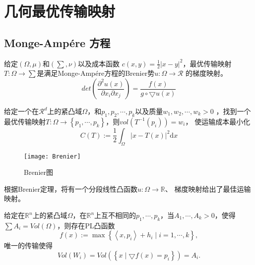 \section{几何最优传输映射}

\subsection{Monge-Amp\'ere 方程}

\begin{problem}[Brenier] \label{pro: Brenier}
    给定$(\Omega, \mu)$和$(\sum, \nu)$以及成本函数 $c(x,y)=\frac{1}{2}\left | x-y \right |^2 $，最优传输映射$T: \Omega \to \sum$是满足Monge-Amp\'ere方程的Brenier势$u:\Omega \to \mathcal{R}$
    的梯度映射。
    \begin{equation}
        \boxed{ det \left ( \frac{\partial ^2 u(x)}{\partial x_i \partial x_j}  \right ) = \frac{f(x)}{g \circ \bigtriangledown u(x)}  }
        \label{equ:Monge-Amp\'ere}
    \end{equation}
\end{problem}

\begin{problem}\label{pro: Semi-discrete OT}
    给定一个在$\mathcal{R}^d$上的紧凸域$\Omega$，和$p_1,p_2,\cdots , p_k$以及质量$w_1,w_2, \cdots , w_k >0$ ，找到一个最优传输映射$T:\Omega \to \left \{ p_1,\cdots ,p_k \right \}$，则$vol(T^{-1}(p_i))=w_i$，
    使运输成本最小化
    \begin{equation}
        C(T):=\frac{1}{2} \int _{\Omega} \left | x-T(x) \right |^2 \mathrm{d}x
        \label{equ:cost} 
    \end{equation}
\end{problem}

\begin{figure}[h]
	\centering
	\texttt{[image: Brenier]}
	\caption{ Brenier图}
	\label{fig: Brenier}
\end{figure}

根据Brenier定理，将有一个分段线性凸函数$u:\Omega \to \mathbb{R}$、 梯度映射给出了最佳运输映射。

\begin{theorem}[Alexandrov 1950]
    给定在$\mathbb{R}^n$上的紧凸域$\Omega$，在$\mathbb{R}^n$上互不相同的$p_1, \cdots , p_k$，当$A_1,\cdots ,A_k >0$，使得 $\sum A_i =Vol(\Omega)$，则存在PL凸函数
    \begin{equation}
        f(x):=\max \left \{ \left \langle x,p_i \right \rangle +h_i \mid i=1, \cdots , k  \right \} ,
        \label{equ:PL convex}
    \end{equation}
    唯一的传输使得
	\begin{equation}
        Vol(W_i)=Vol\left ( \left \{ x \mid \bigtriangledown f(x)=p_i \right \}  \right ) =A_i. 
        \label{equ:Vol}
    \end{equation}
\end{theorem}

